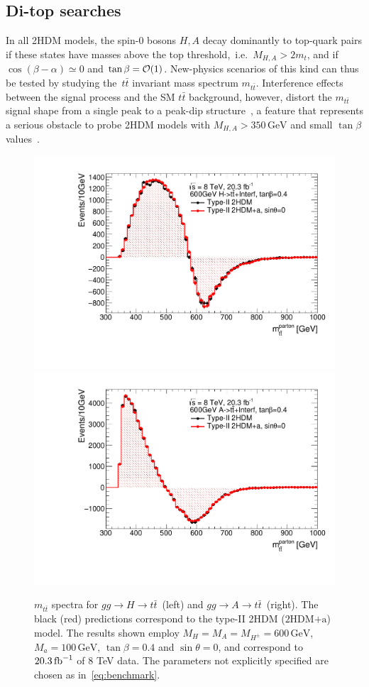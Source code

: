 \documentclass[review]{elsarticle}
\newcommand{\mA}{\ensuremath{M_{A}}\xspace}
\newcommand{\ma}{\ensuremath{M_{a}}\xspace}
\newcommand{\mH}{\ensuremath{M_{H}}\xspace}
\newcommand{\mHc}{\ensuremath{M_{H^{\pm}}}\xspace}
\newcommand{\hdma}{\ensuremath{\textrm{2HDM+a}}\xspace}
\begin{document}
\subsection{Di-top  searches}
\label{sec:ttbarresonances}

 In all 2HDM models, the spin-0 bosons $H,A$  decay dominantly to top-quark pairs if these states have masses above the top threshold,~i.e.~$M_{H, A} > 2 m_t$, and if $\cos (\beta - \alpha) \simeq 0$ and $\tan \beta = {\cal O}(1)$. New-physics scenarios of this kind can thus be tested by studying the~$t \bar t$ invariant mass spectrum $m_{t \bar t}$.  Interference effects between the signal process and the SM  $t \bar t$ background, however,  distort the $m_{t \bar t}$ signal shape from a single peak to a peak-dip structure~\cite{Gaemers:1984sj,Dicus:1994bm,Bernreuther:1997gs,Frederix:2007gi,Hespel:2016qaf,BuarqueFranzosi:2017jrj}, a feature that represents a serious obstacle to probe 2HDM models with $M_{H,A} > 350 \, {\mathrm{GeV}}$ and small $\tan \beta$ values~\cite{Craig:2015jba,Hajer:2015gka,Gori:2016zto,Carena:2016npr}. 

\begin{figure}
\centering
\includegraphics[width=.475\textwidth]{ttres_2HDMvs2HDMa_H.pdf} \quad 
\includegraphics[width=.475\textwidth]{ttres_2HDMvs2HDMa_A.pdf}
\vspace{4mm}
\caption{$m_{t \bar t}$ spectra for $gg \to H \to t \bar t$~(left) and  $gg \to A \to t \bar t$~(right). The black (red) predictions correspond to the type-II 2HDM (\hdma) model.  The  results shown employ $\mH=\mA=\mHc = 600 \, {\mathrm{GeV}}$,  $\ma=100 \, {\mathrm{GeV}}$, $\tan \beta =0.4$ and $\sin \theta = 0$, and correspond to $20.3 \, {\rm fb}^{-1}$ of 8 TeV data.  The parameters not explicitly specified are chosen as in~\eqref{eq:benchmark}.}
\label{fig:ttres_2HDMvs2HDMa}
\end{figure}
\end{document}
